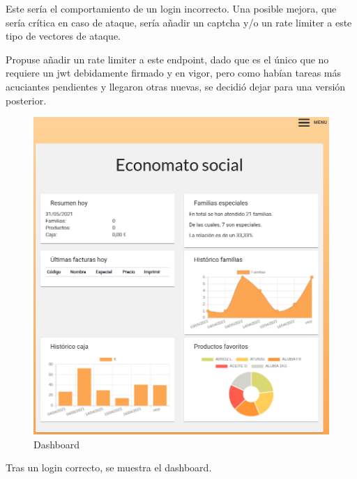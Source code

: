 \vspace{1em}
\par Este sería el comportamiento de un login incorrecto. Una posible mejora, que sería crítica en caso de ataque, sería añadir un captcha y/o un rate limiter a este tipo de vectores de ataque.
\vspace{1em}
\par Propuse añadir un rate limiter a este endpoint, dado que es el único que no requiere un jwt debidamente firmado y en vigor, pero como habían tareas más acuciantes pendientes y llegaron otras nuevas, se decidió dejar para una versión posterior.
\clearpage
\begin{figure}[h]
\centering
\includegraphics[scale=0.47]{archivos/dashboard.png}
\caption{Dashboard}
\label{fig:dashboard}
\end{figure}
\vspace{1em}
\par Tras un login correcto, se muestra el dashboard.
\clearpage

